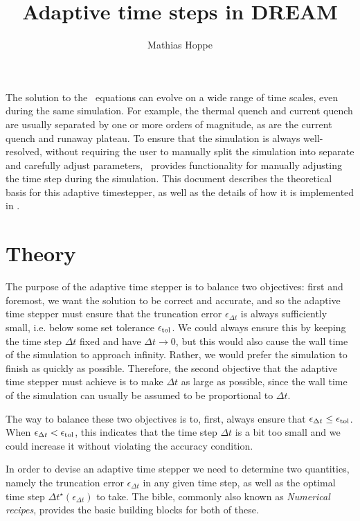 \documentclass{notes}
\title{Adaptive time steps in DREAM}
\author{Mathias Hoppe}
\newcommand{\Deltats}{\Delta t^\star}
\newcommand{\epst}{\epsilon_{\Delta t}}
\newcommand{\epstol}{\epsilon_{\rm tol}}
\begin{document}
    \maketitle

    \noindent
    The solution to the \DREAM\ equations can evolve on a wide range of time
    scales, even during the same simulation. For example, the thermal quench
    and current quench are usually separated by one or more orders of magnitude,
    as are the current quench and runaway plateau. To ensure that the simulation
    is always well-resolved, without requiring the user to manually split the
    simulation into separate and carefully adjust parameters, \DREAM\ provides
    functionality for manually adjusting the time step during the simulation.
    This document describes the theoretical basis for this adaptive timestepper,
    as well as the details of how it is implemented in \DREAM.
    
    \section{Theory}
    The purpose of the adaptive time stepper is to balance two objectives: first
    and foremost, we want the solution to be correct and accurate, and so the
    adaptive time stepper must ensure that the truncation error
    $\epst$ is always sufficiently small, i.e. below some set
    tolerance $\epstol$. We could always ensure this by keeping the time step
    $\Delta t$ fixed and have $\Delta t\to 0$, but this would also cause the
    wall time of the simulation to approach infinity. Rather, we would prefer
    the simulation to finish as quickly as possible. Therefore, the second
    objective that the adaptive time stepper must achieve is to make $\Delta t$
    as large as possible, since the wall time of the simulation can usually be
    assumed to be proportional to $\Delta t$.

    The way to balance these two objectives is to, first, always ensure that
    $\epst\leq\epstol$. When $\epst<\epstol$, this indicates that the time step
    $\Delta t$ is a bit too small and we could increase it without violating the
    accuracy condition.
    
    In order to devise an adaptive time stepper we need to determine two
    quantities, namely the truncation error $\epst$ in any given time step,
    as well as the optimal time step $\Deltats(\epst)$ to take. The bible,
    commonly also known as \emph{Numerical recipes}, provides the basic building
    blocks for both of these.
\end{document}
